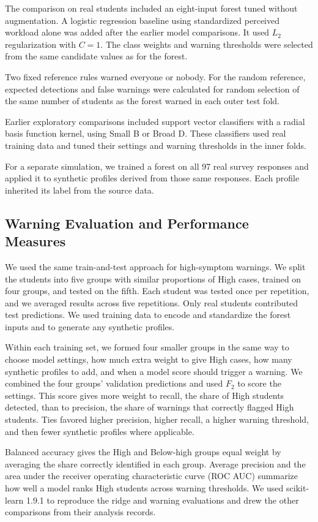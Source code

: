 The comparison on real students included an eight-input forest tuned without augmentation. A logistic regression baseline using standardized perceived workload alone was added after the earlier model comparisons. It used \(L_2\) regularization with \(C=1\). The class weights and warning thresholds were selected from the same candidate values as for the forest.

Two fixed reference rules warned everyone or nobody. For the random reference, expected detections and false warnings were calculated for random selection of the same number of students as the forest warned in each outer test fold.

Earlier exploratory comparisons included support vector classifiers with a radial basis function kernel, using Small B or Broad D. These classifiers used real training data and tuned their settings and warning thresholds in the inner folds.

For a separate simulation, we trained a forest on all 97 real survey responses and applied it to synthetic profiles derived from those same responses. Each profile inherited its label from the source data.

\subsection{Warning Evaluation and Performance Measures}

We used the same train-and-test approach for high-symptom warnings. We split the students into five groups with similar proportions of High cases, trained on four groups, and tested on the fifth. Each student was tested once per repetition, and we averaged results across five repetitions. Only real students contributed test predictions. We used training data to encode and standardize the forest inputs and to generate any synthetic profiles.

Within each training set, we formed four smaller groups in the same way to choose model settings, how much extra weight to give High cases, how many synthetic profiles to add, and when a model score should trigger a warning. We combined the four groups' validation predictions and used \(F_2\) to score the settings. This score gives more weight to recall, the share of High students detected, than to precision, the share of warnings that correctly flagged High students. Ties favored higher precision, higher recall, a higher warning threshold, and then fewer synthetic profiles where applicable.

Balanced accuracy gives the High and Below-high groups equal weight by averaging the share correctly identified in each group. Average precision and the area under the receiver operating characteristic curve (ROC AUC) summarize how well a model ranks High students across warning thresholds. We used scikit-learn 1.9.1 to reproduce the ridge and warning evaluations and drew the other comparisons from their analysis records.

